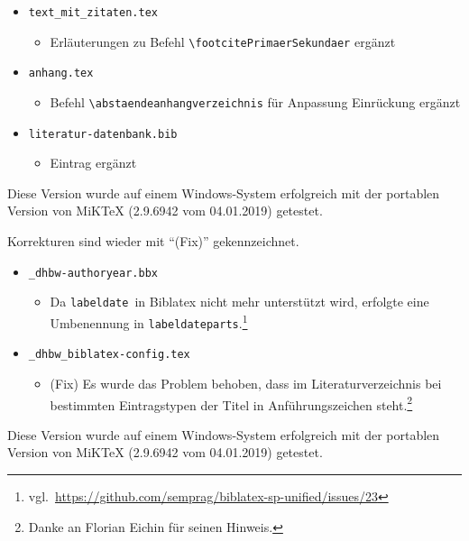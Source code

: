 \begin{itemize}
\item \verb|text_mit_zitaten.tex|
\begin{itemize}
\item Erläuterungen zu Befehl \verb|\footcitePrimaerSekundaer| ergänzt
\end{itemize}

\item \verb|anhang.tex|
\begin{itemize}
\item Befehl \verb|\abstaendeanhangverzeichnis| für Anpassung Einrückung ergänzt
\end{itemize}

\item \verb|literatur-datenbank.bib|
\begin{itemize}
\item Eintrag ergänzt
\end{itemize}

\end{itemize}

\label{anhang:ReleaseNotes17}
Diese Version wurde auf einem Windows-System erfolgreich mit der portablen Version von MiKTeX (2.9.6942 vom 04.01.2019) getestet.

Korrekturen sind wieder mit \enquote{(Fix)} gekennzeichnet.

\begin{itemize}
\item \verb|_dhbw-authoryear.bbx|
\begin{itemize}
\item Da \verb|labeldate| in Biblatex nicht mehr unterstützt wird, erfolgte eine Umbenennung in 
\verb|labeldateparts|.\footnote{vgl.\ \url{https://github.com/semprag/biblatex-sp-unified/issues/23}}
\end{itemize}

\item \verb|_dhbw_biblatex-config.tex|
\begin{itemize}
\item (Fix) Es wurde das Problem behoben, dass im Literaturverzeichnis bei bestimmten Eintragstypen der Titel in Anführungszeichen steht.\footnote{Danke an Florian Eichin für seinen Hinweis.}
\end{itemize}

\end{itemize}


\label{anhang:ReleaseNotes18}
Diese Version wurde auf einem Windows-System erfolgreich mit der portablen Version von MiKTeX (2.9.6942 vom 04.01.2019) getestet.

